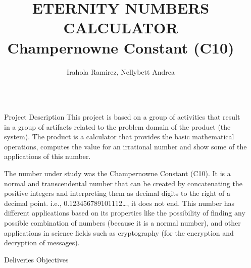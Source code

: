 \documentclass[final]{beamer}
\title{ETERNITY NUMBERS CALCULATOR \\ Champernowne Constant (C10)} %
\author{Irahola Ramirez, Nellybett Andrea} %
\institute{Concordia University, Gina Cody School of Engineering and Computer Science} %
\newlength{\sepwid}
\newlength{\onecolwid}
\begin{document}

\setlength{\belowcaptionskip}{2ex} %
\setlength\belowdisplayshortskip{2ex} %

\begin{frame}[t] %

\begin{columns}[t] %

\begin{column}{\sepwid}\end{column} %

\begin{column}{\onecolwid} %


\begin{block}{Project Description}
This project is based on a group of activities that result in a group of artifacts related to the problem domain of the product (the system). The product is a calculator that provides the basic mathematical operations, computes the value for an irrational number and show some of the applications of this number. \newline

The number under study was the Champernowne Constant (C10).  It is a normal and transcendental number that can be created by concatenating the positive integers and interpreting them as decimal digits to the right of a decimal point. i.e., 0.123456789101112…, it does not end. This number has different applications based on its properties like the possibility of finding any possible combination of numbers (because it is a normal number), and other applications in science fields such as cryptography (for the encryption and decryption of messages). 
\end{block}

\begin{block}{Deliveries Objectives}


\end{block}
\end{column}
\end{columns}
\end{frame}
\end{document}
